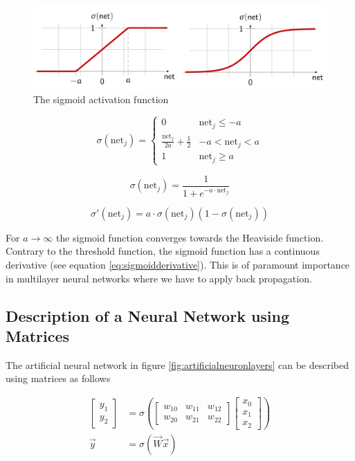 \documentclass[11pt]{article}
\begin{document}
\begin{figure}[tbh!]
    \centering
    \includegraphics[keepaspectratio, width=0.7\linewidth]{Pictures/sigmoid_function}
    \caption{The sigmoid activation function}
    \label{fig:sigmoidfunction}
\end{figure}

\begin{equation}
    \sigma(\text{net}_j) = \left\{ \begin{matrix}0 & \text{net}_j \leq -a\\ \frac{\text{net}_j}{2a} +\frac{1}{2} & -a<\text{net}_j<a \\ 1 & \text{net}_j \geq a \end{matrix} \right.
\end{equation}

\begin{equation}
    \sigma(\text{net}_j) = \frac{1}{1+e^{-a\cdot\text{net}_j}}
\end{equation}

\begin{equation}\label{eq:sigmoidderivative}
    \sigma'(\text{net}_j) = a\cdot\sigma(\text{net}_j)(1-\sigma(\text{net}_j))
\end{equation}


For $a\rightarrow\infty$ the sigmoid function converges towards the Heaviside function. Contrary to the threshold function, the sigmoid function has a continuous derivative (see equation \ref{eq:sigmoidderivative}). This is of paramount importance in multilayer neural networks where we have to apply back propagation.

\subsection{Description of a Neural Network using Matrices}

The artificial neural network in figure \ref{fig:artificialneuronlayers} can be described using matrices as follows

\begin{align}
    \begin{bmatrix}y_1\\y_2\end{bmatrix} &= \sigma\left( \begin{bmatrix}w_{10}&w_{11}&w_{12}\\w_{20}&w_{21}&w_{22}\end{bmatrix}\begin{bmatrix}x_0\\x_1\\x_2\end{bmatrix} \right)\\
    \vec{y} &= \sigma(\vec{W}\vec{x})
\end{align}
\end{document}
